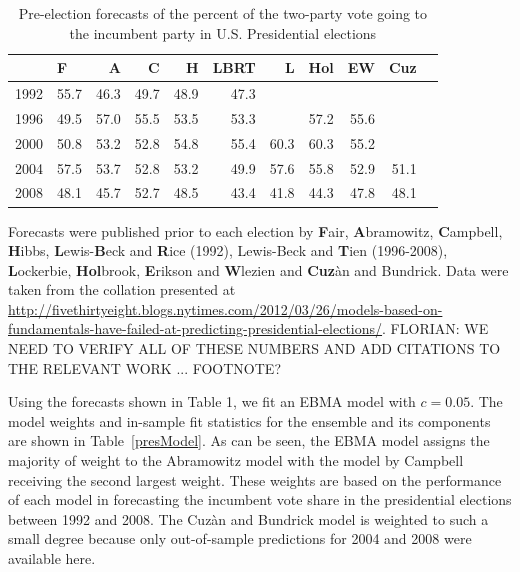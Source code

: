 \documentclass[12pt,fullpage,endnotes]{article}
\begin{document}
\begin{table}[ht]
\caption{Pre-election forecasts of the percent of the two-party vote going to the incumbent party in U.S. Presidential elections}
\label{tab:one}
\footnotesize
\begin{center}
\begin{tabular}{rlrrrrrrrrr}
  \toprule
  & F & A & C & H & LBRT & L & Hol & EW & Cuz \\ 
  \midrule
  1992 & 55.7 & 46.3 & 49.7 & 48.9 & 47.3 &  &  &  &  \\ 
  1996 & 49.5 & 57.0 & 55.5 & 53.5 & 53.3 &  & 57.2 & 55.6 &  \\ 
  2000 & 50.8 & 53.2 & 52.8 & 54.8 & 55.4 & 60.3 & 60.3 & 55.2 &  \\ 
  2004 & 57.5 & 53.7 & 52.8 & 53.2 & 49.9 & 57.6 & 55.8 & 52.9 & 51.1 \\ 
  2008 & 48.1 & 45.7 & 52.7 & 48.5 & 43.4 & 41.8 & 44.3 & 47.8 & 48.1 \\ 
  \bottomrule

\end{tabular}
\end{center}
Forecasts were published prior to each election by \textbf{F}air, \textbf{A}bramowitz, \textbf{C}ampbell, \textbf{H}ibbs, \textbf{L}ewis-\textbf{B}eck and \textbf{R}ice (1992), Lewis-Beck and \textbf{T}ien  (1996-2008),   \textbf{L}ockerbie, \textbf{Hol}brook, \textbf{E}rikson and \textbf{W}lezien and \textbf{Cuz}\`an and Bundrick.  Data were taken from the collation presented at \url{http://fivethirtyeight.blogs.nytimes.com/2012/03/26/models-based-on-fundamentals-have-failed-at-predicting-presidential-elections/}. FLORIAN: WE NEED TO VERIFY ALL OF THESE NUMBERS AND ADD CITATIONS TO THE RELEVANT WORK ... FOOTNOTE?
\end{table}


Using the forecasts shown in Table 1, we fit an EBMA model with
$c=0.05$.  The model weights and in-sample fit statistics for the
ensemble and its components are shown in Table~\ref{presModel}.  As
can be seen, the EBMA model assigns the majority of weight to the
Abramowitz model with the model by Campbell receiving the second
largest weight. These weights are based on the performance of each
model in forecasting the incumbent vote share in the presidential
elections between 1992 and 2008. The Cuz\`an and Bundrick model is
weighted to such a small degree because only out-of-sample predictions
for 2004 and 2008 were available here.
\end{document}
